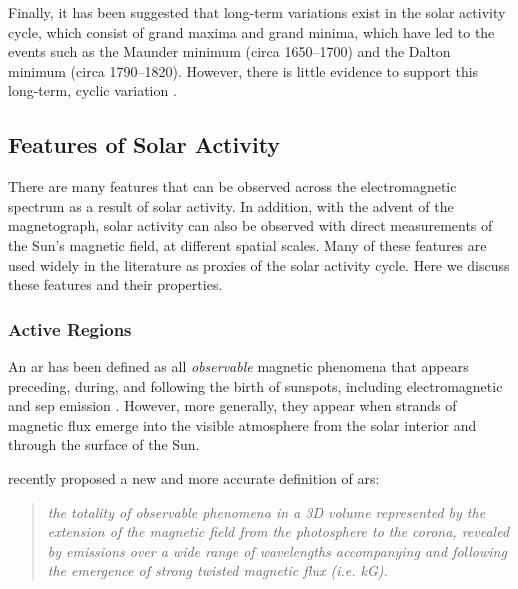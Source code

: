 Finally, it has been suggested that long-term variations exist in the solar activity cycle, which consist of grand maxima and grand minima, which have led to the events such as the Maunder minimum (circa 1650--1700) and the Dalton minimum (circa 1790--1820). However, there is little evidence to support this long-term, cyclic variation \citep{hathaway_solar_2015}.



\subsection{Features of Solar Activity}

There are many features that can be observed across the electromagnetic spectrum as a result of solar activity. In addition, with the advent of the magnetograph, solar activity can also be observed with direct measurements of the Sun's magnetic field, at different spatial scales. Many of these features are used widely in the literature as proxies of the solar activity cycle. Here we discuss these features and their properties.


\subsubsection*{Active Regions}

An \gls{ar} has been defined as all \textit{observable} magnetic phenomena that appears preceding, during, and following the birth of sunspots, including electromagnetic and \gls{sep} emission \citep{kiepenheuer_structure_1968}. However, more generally, they appear when strands of magnetic flux emerge into the visible atmosphere from the solar interior and through the surface of the Sun. 

\citet{van_driel-gesztelyi_evolution_2015} recently proposed a new and more accurate definition of \glspl{ar}:

\begin{quote}
	\textit{the totality of observable phenomena in a 3D volume represented by the extension of the magnetic field from the photosphere to the corona, revealed by emissions over a wide range of wavelengths accompanying and following the emergence of strong twisted magnetic flux (i.e. kG).}%
\end{quote}

